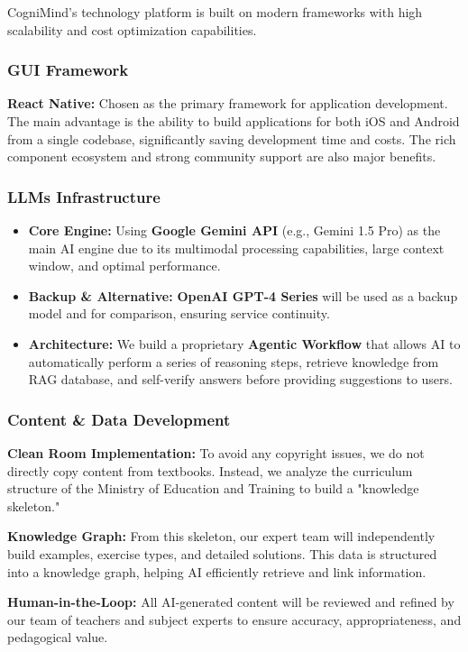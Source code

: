 CogniMind's technology platform is built on modern frameworks with high scalability and cost optimization capabilities.

\subsubsection{GUI Framework}
\textbf{React Native:} Chosen as the primary framework for application development. The main advantage is the ability to build applications for both iOS and Android from a single codebase, significantly saving development time and costs. The rich component ecosystem and strong community support are also major benefits.

\subsubsection{LLMs Infrastructure}
\begin{itemize}
    \item \textbf{Core Engine:} Using \textbf{Google Gemini API} (e.g., Gemini 1.5 Pro) as the main AI engine due to its multimodal processing capabilities, large context window, and optimal performance.
    \item \textbf{Backup \& Alternative:} \textbf{OpenAI GPT-4 Series} will be used as a backup model and for comparison, ensuring service continuity.
    \item \textbf{Architecture:} We build a proprietary \textbf{Agentic Workflow} that allows AI to automatically perform a series of reasoning steps, retrieve knowledge from RAG database, and self-verify answers before providing suggestions to users.
\end{itemize}

\subsubsection{Content \& Data Development}
\textbf{Clean Room Implementation:} To avoid any copyright issues, we do not directly copy content from textbooks. Instead, we analyze the curriculum structure of the Ministry of Education and Training to build a "knowledge skeleton."

\textbf{Knowledge Graph:} From this skeleton, our expert team will independently build examples, exercise types, and detailed solutions. This data is structured into a knowledge graph, helping AI efficiently retrieve and link information.

\textbf{Human-in-the-Loop:} All AI-generated content will be reviewed and refined by our team of teachers and subject experts to ensure accuracy, appropriateness, and pedagogical value.

